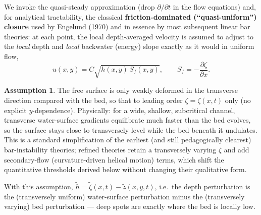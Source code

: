 \documentclass[11pt,a4paper]{report}
\theoremstyle{definition}
\newtheorem{assumption}{Assumption}[chapter]
\theoremstyle{plain}
\theoremstyle{remark}
\newcommand{\pdv}[2]{\dfrac{\partial #1}{\partial #2}}
\begin{document}
We invoke the quasi-steady approximation (drop $\partial/\partial t$ in the flow equations) and, for analytical tractability, the classical \textbf{friction-dominated (``quasi-uniform'') closure} used by Engelund (1970) and in essence by most subsequent linear bar theories: at each point, the local depth-averaged velocity is assumed to adjust to the \emph{local} depth and \emph{local} backwater (energy) slope exactly as it would in uniform flow,
\begin{equation}
u(x,y) = C\sqrt{h(x,y)\,S_f(x,y)}, \qquad S_f = -\pdv{\zeta}{x}.
\label{eq:quasi-uniform}
\end{equation}
\begin{assumption}
The free surface is only weakly deformed in the transverse direction compared with the bed, so that to leading order $\zeta=\zeta(x,t)$ only (no explicit $y$-dependence). Physically: for a wide, shallow, subcritical channel, transverse water-surface gradients equilibrate much faster than the bed evolves, so the surface stays close to transversely level while the bed beneath it undulates. This is a standard simplification of the earliest (and still pedagogically clearest) bar-instability theories; refined theories retain a transversely varying $\zeta$ and add secondary-flow (curvature-driven helical motion) terms, which shift the quantitative thresholds derived below without changing their qualitative form.
\end{assumption}
With this assumption, $\tilde h = \tilde\zeta(x,t) - \tilde z(x,y,t)$, i.e.\ the depth perturbation is the (transversely uniform) water-surface perturbation minus the (transversely varying) bed perturbation --- deep spots are exactly where the bed is locally low.
\end{document}
